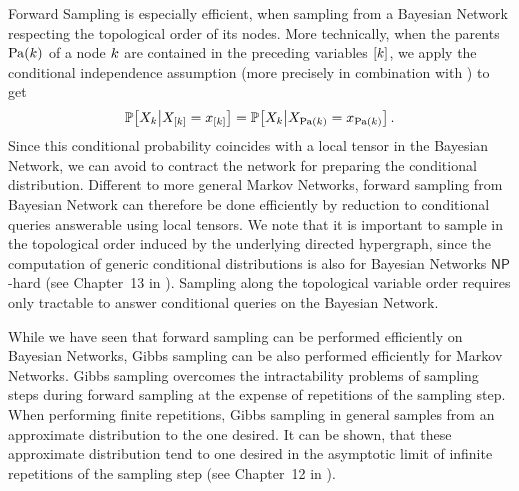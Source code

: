Forward Sampling is especially efficient, when sampling from a Bayesian Network respecting the topological order of its nodes.
More technically, when the parents $\mathrm{Pa}(k)$ of a node $k$ are contained in the preceding variables $[k]$, we apply the conditional independence assumption (more precisely  in combination with ) to get
\begin{align*}
    \mathbb{P}\big[X_{k}\big|X_{[k]}=x_{[k]}\big]
    = \mathbb{P}\big[X_{k}\big|X_{\mathrm{Pa}(k)}=x_{\mathrm{Pa}(k)}\big] \, .
\end{align*}
Since this conditional probability coincides with a local tensor in the Bayesian Network, we can avoid to contract the network for preparing the conditional distribution.
Different to more general Markov Networks, forward sampling from Bayesian Network can therefore be done efficiently by reduction to conditional queries answerable using local tensors.
We note that it is important to sample in the topological order induced by the underlying directed hypergraph, since the computation of generic conditional distributions is also for Bayesian Networks $\mathsf{NP}$-hard (see Chapter~13 in \cite{koller_probabilistic_2009}).
Sampling along the topological variable order requires only tractable to answer conditional queries on the Bayesian Network.



While we have seen that forward sampling can be performed efficiently on Bayesian Networks, Gibbs sampling can be also performed efficiently for Markov Networks.
Gibbs sampling  overcomes the intractability problems of sampling steps during forward sampling at the expense of repetitions of the sampling step.
When performing finite repetitions, Gibbs sampling in general samples from an approximate distribution to the one desired.
It can be shown, that these approximate distribution tend to one desired in the asymptotic limit of infinite repetitions of the sampling step (see Chapter~12 in \cite{koller_probabilistic_2009}).


